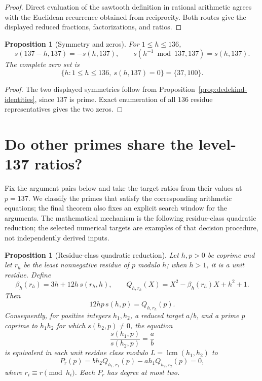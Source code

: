 \documentclass[11pt]{article}
\newtheorem{proposition}[theorem]{Proposition}
\theoremstyle{definition}
\theoremstyle{remark}
\begin{document}
\begin{proof}
Direct evaluation of the sawtooth definition in rational arithmetic agrees
with the Euclidean recurrence obtained from reciprocity.  Both routes give the
displayed reduced fractions, factorizations, and ratios.
\end{proof}

\begin{proposition}[Symmetry and zeros]
\label{prop:dedekind-symmetry-137}
\label{prop:dedekind-zero-partition-137}
For $1\leq h\leq136$,
\[
  s(137-h,137)=-s(h,137),
  \qquad
  s(h^{-1}\bmod137,137)=s(h,137).
\]
The complete zero set is
\[
  \{h:1\leq h\leq136,\ s(h,137)=0\}=\{37,100\}.
\]
\end{proposition}

\begin{proof}
The two displayed symmetries follow from
Proposition~\ref{prop:dedekind-identities}, since $137$ is prime.  Exact
enumeration of all $136$ residue representatives gives the two zeros.
\end{proof}

\section{Do other primes share the level-137 ratios?}
\label{sec:dedekind-prime-loci}

Fix the argument pairs below and take the target ratios from their values at
$p=137$.  We classify the primes that
satisfy the corresponding arithmetic equations; the final theorem also fixes
an explicit search window for the arguments.  The mathematical mechanism is
the following residue-class quadratic reduction; the selected numerical
targets are examples of that decision procedure, not independently derived
inputs.

\begin{proposition}[Residue-class quadratic reduction]
\label{prop:dedekind-residue-quadratic}
Let $h,p>0$ be coprime and let $r_h$ be the least nonnegative residue of $p$
modulo $h$; when $h>1$, it is a unit residue.
Define
\[
  \beta_h(r_h)=3h+12h\,s(r_h,h),
  \qquad
  Q_{h,r_h}(X)=X^2-\beta_h(r_h)X+h^2+1.
\]
Then
\begin{equation}\label{eq:dedekind-residue-q}
  12hp\,s(h,p)=Q_{h,r_h}(p).
\end{equation}
Consequently, for positive integers $h_1,h_2$, a reduced target $a/b$, and a
prime $p$ coprime to $h_1h_2$ for which $s(h_2,p)\neq0$, the equation
\[
  \frac{s(h_1,p)}{s(h_2,p)}=\frac ab
\]
is equivalent in each unit residue class modulo
$L=\operatorname{lcm}(h_1,h_2)$ to
\begin{equation}\label{eq:dedekind-p-r}
  P_r(p)=b h_2 Q_{h_1,r_1}(p)-a h_1 Q_{h_2,r_2}(p)=0,
\end{equation}
where $r_i\equiv r\pmod{h_i}$.  Each $P_r$ has degree at most two.
\end{proposition}
\end{document}
